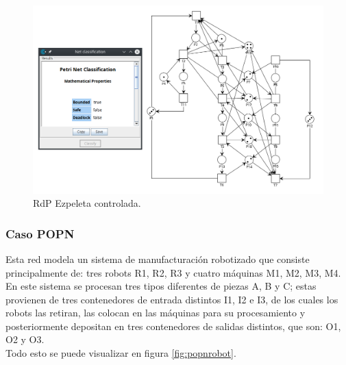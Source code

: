 \begin{figure}[H]
	\centering
	\includegraphics[scale=0.55]{Figures/algoritmo3/ezpeleta5.png}
	\caption{RdP Ezpeleta controlada.}
	\label{fig:ezpeletacontrolada}
 \end{figure}

\subsubsection{Caso POPN} \label{sub:POPN}
Esta red modela un sistema de manufacturación robotizado que consiste principalmente de: tres robots {R1, R2, R3} y cuatro máquinas {M1, M2, M3, M4}.\\
En este sistema se procesan tres tipos diferentes de piezas A, B y C; estas provienen de tres contenedores de entrada distintos I1, I2 e I3, de los cuales los robots las retiran, las colocan en las máquinas para su procesamiento y posteriormente depositan en tres contenedores de salidas distintos, que son: O1, O2 y O3. \\
Todo esto se puede visualizar en figura \ref{fig:popnrobot}.

